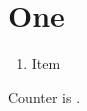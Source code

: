 \documentclass{article}
\newcounter{mycnt}
\begin{document}
\section{One}\label{k:d}
\begin{enumerate}
\renewcommand{\labelenumi}{\alph{enumi})}
\renewcommand{\theenumi}{\alph{enumi}}
\item Item\label{k:d2}
\end{enumerate}
Counter is \themycnt.
\end{document}
